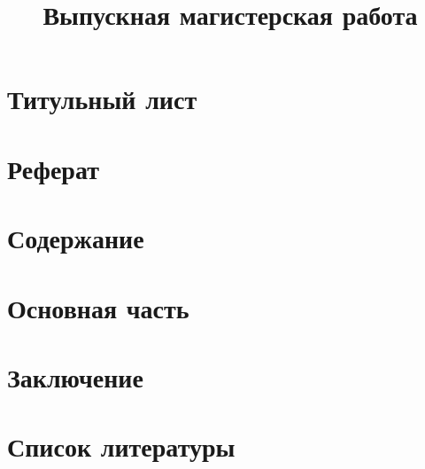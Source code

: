\documentclass[12pt,a4paper]{report} %
\begin{document}
\title{Выпускная магистерская работа}

\section{Титульный лист}


\tableofcontents

\section{Реферат}


\section{Содержание}


\section{Основная часть}


\section{Заключение}


\section{Список литературы}

\end{document}
